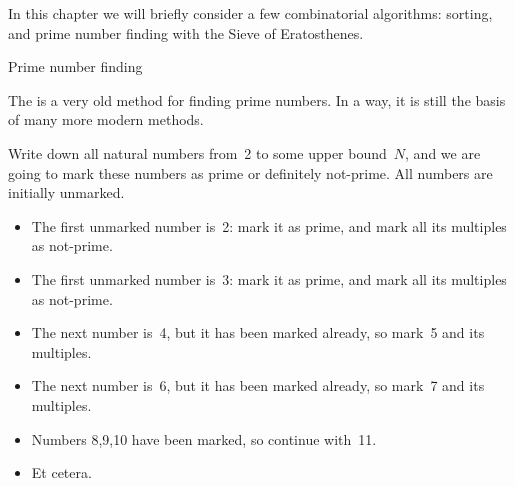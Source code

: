 

In this chapter we will briefly consider a few combinatorial algorithms:
sorting, and prime number finding with the Sieve of Eratosthenes.



 {Prime number finding}

The  is a very old method for finding prime numbers.
In a way, it is still the basis of many more modern methods.

Write down all natural numbers from~2 to some upper bound~$N$,
and we are going to mark these numbers as prime or definitely not-prime.
All numbers are initially unmarked.
\begin{itemize}
\item The first unmarked number is~2: mark it as prime, and mark all its
  multiples as not-prime.
\item The first unmarked number is~3: mark it as prime, and mark all its
  multiples as not-prime.
\item The next number is~4, but it has been marked already, so mark~5
  and its multiples.
\item The next number is~6, but it has been marked already, so mark~7
  and its multiples.
\item Numbers 8,9,10 have been marked, so continue with~11.
\item Et cetera.
\end{itemize}

